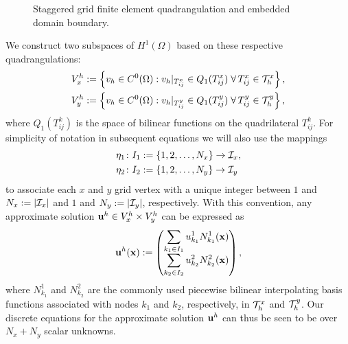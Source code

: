 \setlength{\figurewidth}{0.33\textwidth}
\begin{figure}[htbp]
\centering
{}
\caption{Staggered grid finite element quadrangulation and embedded domain boundary.}
\label{fig:chap5.embedding}
\end{figure}

We construct two subspaces of $H^1(\Omega)$ based on these respective quadrangulations:
\begin{align*}
V_x^h & := \left\lbrace  v_h \in C^0(\Omega) : v_h \rvert_{T^x_{ij}} \in Q_1(T^x_{ij}) \; \forall \, T^x_{ij} \in \mathcal{T}^x_h  \right\rbrace, \\
V_y^h & := \left\lbrace  v_h \in C^0(\Omega) : v_h \rvert_{T^y_{ij}} \in Q_1(T^y_{ij}) \; \forall \, T^y_{ij} \in \mathcal{T}^y_h  \right\rbrace,
\end{align*}
where $Q_1(T^k_{ij})$ is the space of bilinear functions on the quadrilateral $T^k_{ij}$. For simplicity of notation in subsequent equations we will also use the mappings
\begin{align*}
& \eta_1 \colon I_1 := \{ 1, 2, \dotsc, N_x \} \to \mathcal{I}_x, \\
& \eta_2 \colon I_2 := \{1, 2, \dotsc, N_y \} \to \mathcal{I}_y
\end{align*}
to associate each $x$ and $y$ grid vertex with a unique integer between $1$ and
$N_x := \left\lvert \mathcal{I}_x \right\rvert$ and $1$ and $N_y := \left\lvert \mathcal{I}_y \right\rvert$, respectively. With this convention, any approximate solution $\mathbf{u}^h \in V_x^h \times V_y^h$ can be expressed as
\begin{equation} \label{eq:chap5.staggeredapproximation.u}
\mathbf{u}^h(\mathbf{x}) :=
\begin{pmatrix}
\displaystyle \sum_{k_1 \in I_1} u^1_{k_1} N^1_{k_1}(\mathbf{x}) \\
\displaystyle \sum_{k_2 \in I_2} u^2_{k_2} N^2_{k_2}(\mathbf{x})
\end{pmatrix},
\end{equation}
where $N^1_{k_1}$ and $N^2_{k_2}$ are the commonly used piecewise bilinear interpolating basis functions associated with nodes $k_1$ and $k_2$, respectively, in $\mathcal{T}^x_h$ and $\mathcal{T}^y_h$. Our discrete equations for the approximate solution $\mathbf{u}^h$ can thus be seen to be over $N_x + N_y$ scalar unknowns.

